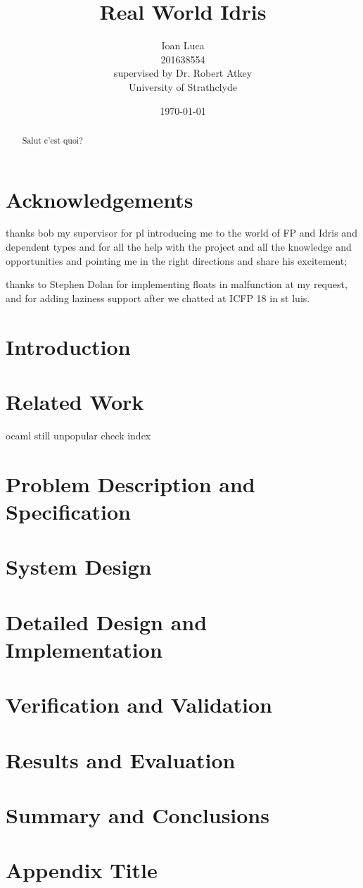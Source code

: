 \documentclass[a4paper, 12pt, oneside]{report}
\title{Real World Idris}
\author{Ioan Luca \\ 201638554 \\ \small supervised by Dr. Robert Atkey \\
	\small University of Strathclyde} %
\date{\today}
\begin{document}
\maketitle


\listoffigures
\listoftables

\chapter*{Acknowledgements}
 thanks bob my supervisor for pl introducing me to the world of FP and Idris and dependent types and for all the help with the project and all the knowledge and opportunities and  pointing me in the right directions and share his excitement;

 thanks to Stephen Dolan for implementing floats in malfunction at my request, and for adding laziness support after we chatted at ICFP 18 in st luis.

\begin{abstract}
    Salut c'est quoi?
\end{abstract}

\tableofcontents


\chapter{Introduction}
\label{ch:intro}


\chapter{Related Work}
\label{ch:techintro}
ocaml still unpopular check index

\chapter{Problem Description and Specification}
\label{ch:method}

\chapter{System Design}
\label{ch:results}

\chapter{Detailed Design and Implementation}
\label{ch:conc}

\chapter{Verification and Validation}

\chapter{Results and Evaluation}

\chapter{Summary and Conclusions}

\appendix
\chapter{Appendix Title}




\end{document}
